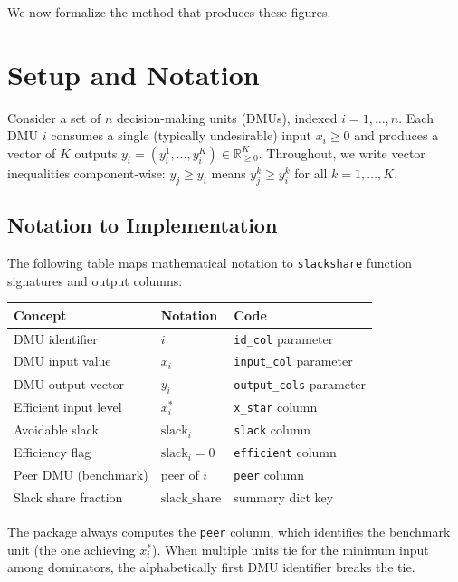 \documentclass[11pt]{article}
\theoremstyle{definition}
\theoremstyle{plain}
\theoremstyle{remark}
\begin{document}
We now formalize the method that produces these figures.

\section{Setup and Notation}

Consider a set of $n$ decision-making units (DMUs), indexed $i = 1, \ldots, n$.
Each DMU $i$ consumes a single (typically undesirable) input $x_i \ge 0$ and produces a vector of $K$ outputs
$y_i = (y_i^1, \ldots, y_i^K) \in \mathbb{R}_{\ge 0}^K$.
Throughout, we write vector inequalities component-wise: $y_j \ge y_i$ means $y_j^k \ge y_i^k$ for all $k = 1, \ldots, K$.

\subsection*{Notation to Implementation}

The following table maps mathematical notation to \texttt{slackshare} function signatures and output columns:

\begin{table}[h]
\centering
\begin{tabular}{lll}
\toprule
\textbf{Concept} & \textbf{Notation} & \textbf{Code} \\
\midrule
DMU identifier & $i$ & \texttt{id\_col} parameter \\
DMU input value & $x_i$ & \texttt{input\_col} parameter \\
DMU output vector & $y_i$ & \texttt{output\_cols} parameter \\
Efficient input level & $x_i^*$ & \texttt{x\_star} column \\
Avoidable slack & $\text{slack}_i$ & \texttt{slack} column \\
Efficiency flag & $\text{slack}_i = 0$ & \texttt{efficient} column \\
Peer DMU (benchmark) & peer of $i$ & \texttt{peer} column \\
Slack share fraction & $\text{slack\_share}$ & summary dict key \\
\bottomrule
\end{tabular}
\end{table}

The package always computes the \texttt{peer} column, which identifies the benchmark unit (the one achieving $x_i^*$).
When multiple units tie for the minimum input among dominators, the alphabetically first DMU identifier breaks the tie.
\end{document}
